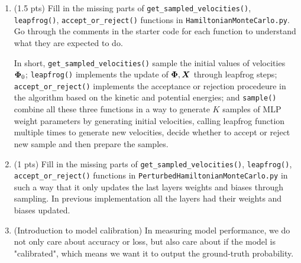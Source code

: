 \begin{enumerate}
%
   
\item
    (1.5 pts) Fill in the missing parts of \texttt{get\_sampled\_velocities()}, \texttt{leapfrog()}, \texttt{accept\_or\_reject()} functions in \texttt{HamiltonianMonteCarlo.py}. Go through the comments in the starter code for each function to understand what they are expected to do. 
    
    In short, \texttt{get\_sampled\_velocities()} sample the initial values of velocities $\bm{\Phi}_{0}$; \texttt{leapfrog()} implements the update of $\bm{\Phi}, \bm{X}$ through leapfrog steps; \texttt{accept\_or\_reject()} implements the acceptance or rejection procedeure in the algorithm based on the kinetic and potential energies; and \texttt{sample()} combine all these three functions in a way to generate $K$ samples of MLP weight parameters by generating initial velocities, calling leapfrog function multiple times to generate new velocities, decide whether to accept or reject new sample and then prepare the samples.    
    
\item (1 pts) Fill in the missing parts of \texttt{get\_sampled\_velocities()}, \texttt{leapfrog()}, \texttt{accept\_or\_reject()} functions in \texttt{PerturbedHamiltonianMonteCarlo.py} in such a way that it only updates the last layers weights and biases through sampling. In previous implementation all the layers had their weights and biases updated.

\item (Introduction to model calibration) In measuring model performance, we do not only care about accuracy or loss, but also care about if the model is "calibrated", which means we want it to output the ground-truth probability.


\end{enumerate}
